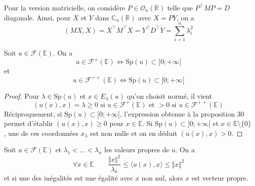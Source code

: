\begin{remark}

Pour la version matricielle, on considère $P \in \mathcal{O}_n(\mathbb{R})$ telle que $P^\top MP = D$ diagonale. Ainsi, pour $X$ et $Y$ dans $\mathbb{C}_n(\mathbb{R})$ avec $X = PY$, on a
\[
(MX, X) = X^\top M^\top X = Y^\top D^\top Y = \sum_{i=1}^n \lambda_i^2
\]
\end{remark}

\begin{theorem}
\label{thm:11}

Soit $u \in \mathcal{F}(\mathbb{E})$. On a
\[
u \in \mathcal{F}^+(\mathbb{E}) \Leftrightarrow \text{Sp}(u) \subset [0; +\infty[
\]
et
\[
u \in \mathcal{F}^{++}(\mathbb{E}) \Leftrightarrow \text{Sp}(u) \subset ]0; +\infty[
\]
\end{theorem}

\begin{proof}

Pour $\lambda \in \text{Sp}(u)$ et $x \in E_\lambda(u)$ qu'on choisit normé, il vient
\[
(u(x), x) = \lambda \geq 0 \text{ si } u \in \mathcal{F}^+(\mathbb{E}) \text{ et } > 0 \text{ si } u \in \mathcal{F}^{++}(\mathbb{E})
\]
Réciproquement, si $\text{Sp}(u) \subset [0; +\infty[$, l'expression obtenue à la proposition 30 permet d'établir $(u(x), x) \geq 0$ pour $x \in \mathbb{E}$. Si $\text{Sp}(u) \subset ]0; +\infty[$ et $x \in \mathbb{E} \setminus \{0\}$, une de ces coordonnées $x_\lambda$ est non nulle et on en déduit $(u(x), x) > 0$.

\end{proof}

\begin{theorem}
\label{thm:a-savoir-refaire}

Soit $u \in \mathcal{F}(\mathbb{E})$ et $\lambda_1 < \dots < \lambda_n$ les valeurs propres de $u$. On a
\[
\forall x \in \mathbb{E} \qquad \frac{\Vert x \Vert^2}{\lambda_n} \leq \langle u(x), x \rangle \leq \Vert x \Vert^2
\]
et si une des inégalités est une égalité avec $x$ non nul, alors $x$ est vecteur propre.

\end{theorem}

